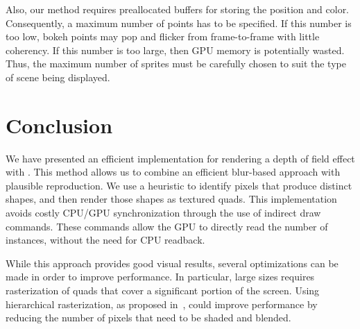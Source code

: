 Also, our method requires preallocated buffers for storing the \bokeh position and color. Consequently, a maximum number of \bokeh points has to be specified. If this number is too low, bokeh points may pop and flicker from frame-to-frame with little coherency. If this number is too large, then GPU memory is potentially wasted. Thus, the maximum number of sprites must be carefully chosen to suit the type of scene being displayed.

\section{Conclusion}
We have presented an efficient implementation for rendering a depth of field effect with \bokeh. This method allows us to combine an efficient blur-based approach with plausible \bokeh reproduction. We use a heuristic to identify pixels that produce distinct \bokeh shapes, and then render those shapes as textured quads. This implementation avoids costly CPU/GPU synchronization through the use of indirect draw commands. These commands allow the GPU to directly read the number of instances, without the need for CPU readback.

While this approach provides good visual results, several optimizations can be made in order to improve performance. In particular, large \coc sizes requires rasterization of quads that cover a significant portion of the screen. Using hierarchical rasterization, as proposed in~\cite{Futurmark11}, could improve performance by reducing the number of pixels that need to be shaded and blended.



